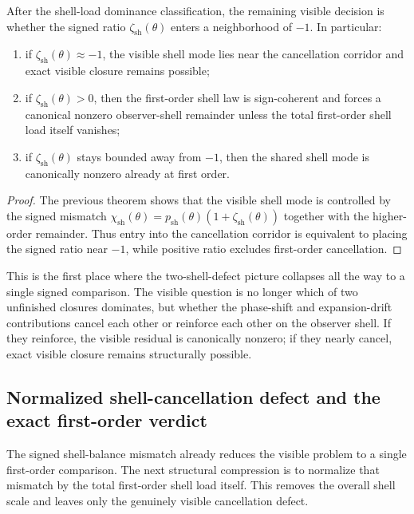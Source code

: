 \begin{corollary}
After the shell-load dominance classification, the remaining visible decision is whether the signed ratio $\zeta_{\mathrm{sh}}(\theta)$ enters a neighborhood of $-1$. In particular:
\begin{enumerate}[leftmargin=2em,label=(\roman*)]
\item if $\zeta_{\mathrm{sh}}(\theta)\approx -1$, the visible shell mode lies near the cancellation corridor and exact visible closure remains possible;
\item if $\zeta_{\mathrm{sh}}(\theta)>0$, then the first-order shell law is sign-coherent and forces a canonical nonzero observer-shell remainder unless the total first-order shell load itself vanishes;
\item if $\zeta_{\mathrm{sh}}(\theta)$ stays bounded away from $-1$, then the shared shell mode is canonically nonzero already at first order.
\end{enumerate}
\end{corollary}

\begin{proof}
The previous theorem shows that the visible shell mode is controlled by the signed mismatch $\chi_{\mathrm{sh}}(\theta)=p_{\mathrm{sh}}(\theta)(1+\zeta_{\mathrm{sh}}(\theta))$ together with the higher-order remainder. Thus entry into the cancellation corridor is equivalent to placing the signed ratio near $-1$, while positive ratio excludes first-order cancellation.
\end{proof}

\begin{remark}
This is the first place where the two-shell-defect picture collapses all the way to a single signed comparison. The visible question is no longer which of two unfinished closures dominates, but whether the phase-shift and expansion-drift contributions cancel each other or reinforce each other on the observer shell. If they reinforce, the visible residual is canonically nonzero; if they nearly cancel, exact visible closure remains structurally possible.
\end{remark}


\subsection*{Normalized shell-cancellation defect and the exact first-order verdict}
The signed shell-balance mismatch already reduces the visible problem to a single first-order comparison. The next structural compression is to normalize that mismatch by the total first-order shell load itself. This removes the overall shell scale and leaves only the genuinely visible cancellation defect.

